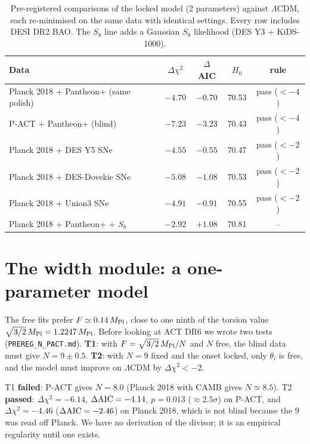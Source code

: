 \documentclass[11pt]{article}
\newcommand{\Mp}{M_{\rm Pl}}
\begin{document}
\begin{table}[h]
\centering
\small
\begin{tabular}{lcccc}
\toprule
Data & $\Delta\chi^2$ & $\Delta$AIC & $H_0$ & rule\\
\midrule
Planck 2018 + Pantheon+ (same polish) & $-4.70$ & $-0.70$ & 70.53 & pass ($<-4$)\\
P-ACT + Pantheon+ (blind) & $-7.23$ & $-3.23$ & 70.43 & pass ($<-4$)\\
Planck 2018 + DES Y5 SNe & $-4.55$ & $-0.55$ & 70.47 & pass ($<-2$)\\
Planck 2018 + DES-Dovekie SNe & $-5.08$ & $-1.08$ & 70.53 & pass ($<-2$)\\
Planck 2018 + Union3 SNe & $-4.91$ & $-0.91$ & 70.55 & pass ($<-2$)\\
Planck 2018 + Pantheon+ + $S_8$ & $-2.92$ & $+1.08$ & 70.81 & --\\
\bottomrule
\end{tabular}
\caption{Pre-registered comparisons of the locked model (2 parameters) against $\Lambda$CDM, each
re-minimised on the same data with identical settings. Every row includes DESI DR2 BAO. The $S_8$ line
adds a Gaussian $S_8$ likelihood (DES Y3 + KiDS-1000).}
\label{tab:prereg}
\end{table}

\section{The width module: a one-parameter model}\label{sec:width}
The free fits prefer $F\simeq0.14\,\Mp$, close to one ninth of the torsion value
$\sqrt{3/2}\,\Mp=1.2247\,\Mp$. Before looking at ACT DR6 we wrote two tests
(\texttt{PREREG\_N\_PACT.md}). \textbf{T1}: with $F=\sqrt{3/2}\,\Mp/N$ and $N$ free, the blind data
must give $N=9\pm0.5$. \textbf{T2}: with $N=9$ fixed and the onset locked, only $\theta_i$ is free,
and the model must improve on $\Lambda$CDM by $\Delta\chi^2<-2$.

T1 \textbf{failed}: P-ACT gives $N=8.0$ (Planck 2018 with CAMB gives $N\simeq8.5$). T2
\textbf{passed}: $\Delta\chi^2=-6.14$, $\Delta{\rm AIC}=-4.14$, $p=0.013$ ($\approx2.5\sigma$) on P-ACT, and
$\Delta\chi^2=-4.46$ ($\Delta{\rm AIC}=-2.46$) on Planck 2018, which is not blind because the 9 was read
off Planck. We have no derivation of the divisor; it is an empirical regularity until one exists.
\end{document}
